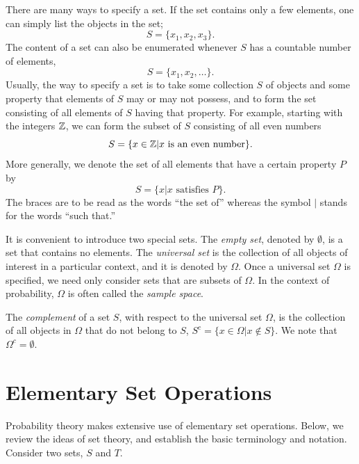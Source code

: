 There are many ways to specify a set.
If the set contains only a few elements, one can simply list the objects in the set;
\begin{equation*}
S = \{ x_1, x_2, x_3 \} .
\end{equation*}
The content of a set can also be enumerated whenever $S$ has a countable number of elements,
\begin{equation*}
S = \{ x_1, x_2, \ldots \} .
\end{equation*}
Usually, the way to specify a set is to take some collection $S$ of objects and some property that elements of $S$ may or may not possess, and to form the set consisting of all elements of $S$ having that property.
For example, starting with the integers $\mathbb{Z}$, we can form the subset of $S$ consisting of all even numbers
\begin{equation*}
S = \{ x \in \mathbb{Z} | x \text{ is an even number} \}.
\end{equation*}
More generally, we denote the set of all elements that have a certain property $P$ by
\begin{equation*}
S = \{ x | x \text{ satisfies } P \} .
\end{equation*}
The braces are to be read as the words ``the set of'' whereas the symbol $|$ stands for the words ``such that.''

It is convenient to introduce two special sets.
The \emph{empty set}, denoted by $\emptyset$, is a set that contains no elements.
The \emph{universal set} is the collection of all objects of interest in a particular context, and it is denoted by $\Omega$.
Once a universal set $\Omega$ is specified, we need only consider sets that are subsets of $\Omega$.
In the context of probability, $\Omega$ is often called the \emph{sample space}.

The \emph{complement} of a set $S$, with respect to the universal set $\Omega$, is the collection of all objects in $\Omega$ that do not belong to $S$,
$S^c = \{ x \in \Omega | x \notin S \}$.
We note that $\Omega^c = \emptyset$.


\section{Elementary Set Operations}

Probability theory makes extensive use of elementary set operations.
Below, we review the ideas of set theory, and establish the basic terminology and notation.
Consider two sets, $S$ and $T$.

